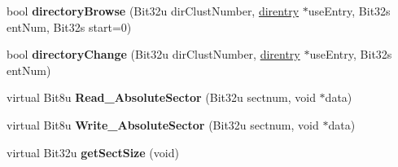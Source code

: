 \begin{DoxyCompactItemize}
\item 
\hypertarget{classfatDrive_accabf68f45861dba60d9c93981c816c4}{bool {\bfseries directory\-Browse} (Bit32u dir\-Clust\-Number, \hyperlink{structdirentry}{direntry} $\ast$use\-Entry, Bit32s ent\-Num, Bit32s start=0)}\label{classfatDrive_accabf68f45861dba60d9c93981c816c4}

\item 
\hypertarget{classfatDrive_a33bfa188995f1f5bf813af5a5b8e24ba}{bool {\bfseries directory\-Change} (Bit32u dir\-Clust\-Number, \hyperlink{structdirentry}{direntry} $\ast$use\-Entry, Bit32s ent\-Num)}\label{classfatDrive_a33bfa188995f1f5bf813af5a5b8e24ba}

\item 
\hypertarget{classfatDrive_a0347726faa951ece86554389c1582365}{virtual Bit8u {\bfseries Read\-\_\-\-Absolute\-Sector} (Bit32u sectnum, void $\ast$data)}\label{classfatDrive_a0347726faa951ece86554389c1582365}

\item 
\hypertarget{classfatDrive_a0a2171e173e8718bc73b2a4ce7493aa6}{virtual Bit8u {\bfseries Write\-\_\-\-Absolute\-Sector} (Bit32u sectnum, void $\ast$data)}\label{classfatDrive_a0a2171e173e8718bc73b2a4ce7493aa6}

\item 
\hypertarget{classfatDrive_a8eec794d6977defe23a899c4ced8344d}{virtual Bit32u {\bfseries get\-Sect\-Size} (void)}\label{classfatDrive_a8eec794d6977defe23a899c4ced8344d}

\end{DoxyCompactItemize}
